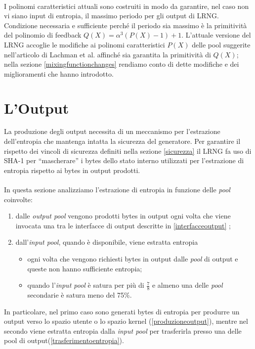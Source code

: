 \documentclass{article}
\begin{document}
 \begin{center}
 \end{center}
 
 \paragraph{}I polinomi caratteristici attuali sono costruiti in modo da
 garantire, nel caso non vi siano input di entropia, il massimo periodo per gli output di LRNG.
 Condizione necessaria e sufficiente perché il periodo sia massimo è la
 primitività del polinomio di feedback $Q(X)=\alpha^3(P(X)-1)+1$.
 L'attuale versione del LRNG accoglie le modifiche ai polinomi caratteristici
 $P(X)$ delle pool suggerite nell'articolo di Lachman et al. \cite{lach}
 affinché sia garantita la primitività di $Q(X)$; nella sezione
 \ref{mixingfunctionchanges} rendiamo conto di dette modifiche e dei
 miglioramenti che hanno introdotto.
 
 \section{L'Output}
 La produzione degli output necessita di un meccanismo per l'estrazione
 dell'entropia che mantenga intatta la sicurezza del generatore. Per
 garantire il rispetto dei vincoli di sicurezza definiti nella sezione
 \ref{sicurezza} il LRNG fa uso di SHA-1 per ``mascherare'' i bytes dello
 stato interno utilizzati per l'estrazione di entropia rispetto ai bytes in
 output prodotti.
 \paragraph{}In questa sezione analizziamo l'estrazione di entropia in funzione
 delle \emph{pool} coinvolte:
 \begin{enumerate}
   \item dalle \emph{output pool} vengono prodotti bytes in output ogni
 volta che viene invocata una tra le interfacce di output descritte in
 \ref{interfacceoutput} ;
 \item dall'\emph{input pool}, quando è disponibile, viene
 estratta entropia 
 \begin{itemize}
   \item ogni volta che vengono richiesti bytes in output dalle
   \emph{pool} di output e queste non hanno sufficiente entropia;
   \item quando l'\emph{input pool} è satura per più di $\frac{7}{8}$ e almeno
   una delle \emph{pool} secondarie è satura meno del 75\%.
 \end{itemize}
 \end{enumerate}
 In particolare, nel primo caso sono generati bytes di entropia per produrre un
 output verso lo spazio utente o lo spazio kernel (\ref{produzioneoutput}), mentre nel
 secondo viene estratta entropia dalla \emph{input pool} per trasferirla presso
 una delle pool di output(\ref{trasferimentoentropia}).
 
\end{document}
